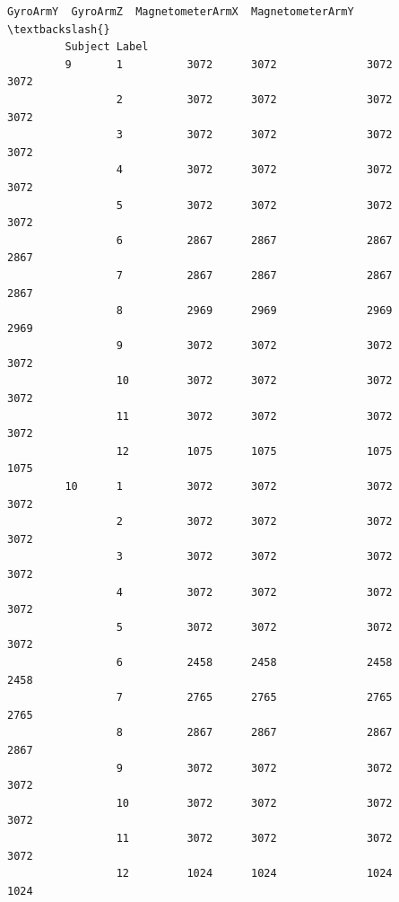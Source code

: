 \documentclass[11pt]{article}
\begin{document}
\begin{Verbatim}[commandchars=\\\{\}]
                        GyroArmY  GyroArmZ  MagnetometerArmX  MagnetometerArmY  \textbackslash{}
         Subject Label                                                           
         9       1          3072      3072              3072              3072   
                 2          3072      3072              3072              3072   
                 3          3072      3072              3072              3072   
                 4          3072      3072              3072              3072   
                 5          3072      3072              3072              3072   
                 6          2867      2867              2867              2867   
                 7          2867      2867              2867              2867   
                 8          2969      2969              2969              2969   
                 9          3072      3072              3072              3072   
                 10         3072      3072              3072              3072   
                 11         3072      3072              3072              3072   
                 12         1075      1075              1075              1075   
         10      1          3072      3072              3072              3072   
                 2          3072      3072              3072              3072   
                 3          3072      3072              3072              3072   
                 4          3072      3072              3072              3072   
                 5          3072      3072              3072              3072   
                 6          2458      2458              2458              2458   
                 7          2765      2765              2765              2765   
                 8          2867      2867              2867              2867   
                 9          3072      3072              3072              3072   
                 10         3072      3072              3072              3072   
                 11         3072      3072              3072              3072   
                 12         1024      1024              1024              1024   
         

\end{Verbatim}
\end{document}
